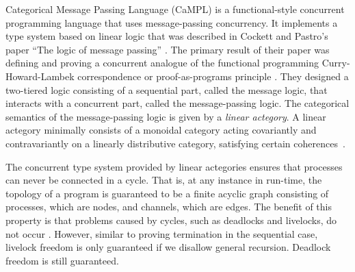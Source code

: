 \documentclass[11pt]{article}
\begin{document}
Categorical Message Passing Language (CaMPL) is a functional-style concurrent programming language that uses message-passing concurrency.
It implements a type system based on linear logic that was described in Cockett and Pastro’s paper ``The logic of message passing'' \cite{CoP07}. The primary result of their paper was defining and proving a concurrent analogue of the functional programming Curry-Howard-Lambek correspondence or proof-as-programs principle \cite{Howard1980, Lambek1969, Lambek1972}. They designed a two-tiered logic consisting of a sequential part, called the message logic, that interacts with a concurrent part, called the message-passing logic. 
The categorical semantics of the message-passing logic is given by a {\em linear actegory}.
A linear actegory minimally consists of a monoidal category acting covariantly and contravariantly on a linearly distributive category, 
satisfying certain coherences~\cite{CoP07, CS97}. 

The concurrent type system provided by linear actegories ensures that processes can never be connected in a cycle.
That is, at any instance in run-time, the topology of a program is guaranteed to be a finite acyclic graph consisting of processes, which are nodes, and channels, which are edges.
The benefit of this property is that problems caused by cycles, such as deadlocks and livelocks, do not occur \cite{Ly18}.
However, similar to proving termination in the sequential case, livelock freedom is only guaranteed if we disallow general recursion.
Deadlock freedom is still guaranteed.
\end{document}
